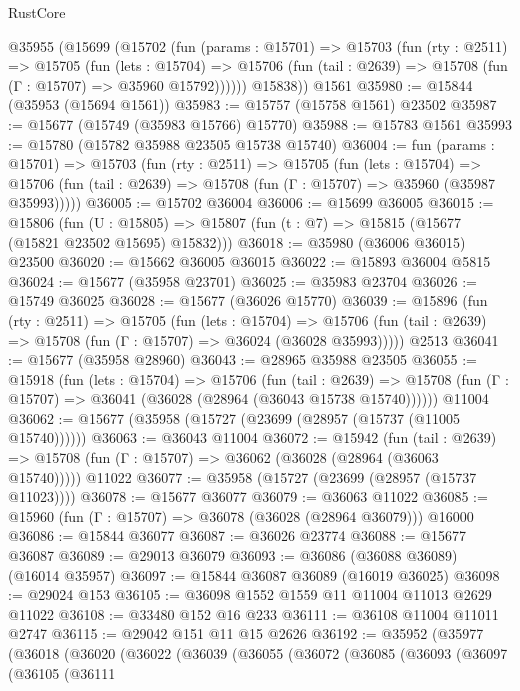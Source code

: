 \begin{lexlean}{RustCore}
\begin{coremodule}
    @35955
      (@15699
        (@15702
          (fun (params : @15701) =>
          @15703
            (fun (rty : @2511) =>
            @15705
              (fun (lets : @15704) =>
              @15706 (fun (tail : @2639) => @15708 (fun (Γ : @15707) => @35960 @15792))))))
        @15838))
    @1561
@35980 := @15844 (@35953 (@15694 @1561))
@35983 := @15757 (@15758 @1561) @23502
@35987 := @15677 (@15749 (@35983 @15766) @15770)
@35988 := @15783 @1561
@35993 := @15780 (@15782 @35988 @23505 @15738 @15740)
@36004 := fun (params : @15701) =>
  @15703
    (fun (rty : @2511) =>
    @15705
      (fun (lets : @15704) =>
      @15706 (fun (tail : @2639) => @15708 (fun (Γ : @15707) => @35960 (@35987 @35993)))))
@36005 := @15702 @36004
@36006 := @15699 @36005
@36015 := @15806
    (fun (U : @15805) => @15807 (fun (t : @7) => @15815 (@15677 (@15821 @23502 @15695) @15832)))
@36018 := @35980 (@36006 @36015) @23500
@36020 := @15662 @36005 @36015
@36022 := @15893 @36004 @5815
@36024 := @15677 (@35958 @23701)
@36025 := @35983 @23704
@36026 := @15749 @36025
@36028 := @15677 (@36026 @15770)
@36039 := @15896
    (fun (rty : @2511) =>
    @15705
      (fun (lets : @15704) =>
      @15706 (fun (tail : @2639) => @15708 (fun (Γ : @15707) => @36024 (@36028 @35993)))))
    @2513
@36041 := @15677 (@35958 @28960)
@36043 := @28965 @35988 @23505
@36055 := @15918
    (fun (lets : @15704) =>
    @15706
      (fun (tail : @2639) =>
      @15708 (fun (Γ : @15707) => @36041 (@36028 (@28964 (@36043 @15738 @15740))))))
    @11004
@36062 := @15677 (@35958 (@15727 (@23699 (@28957 (@15737 (@11005 @15740))))))
@36063 := @36043 @11004
@36072 := @15942
    (fun (tail : @2639) => @15708 (fun (Γ : @15707) => @36062 (@36028 (@28964 (@36063 @15740)))))
    @11022
@36077 := @35958 (@15727 (@23699 (@28957 (@15737 @11023))))
@36078 := @15677 @36077
@36079 := @36063 @11022
@36085 := @15960 (fun (Γ : @15707) => @36078 (@36028 (@28964 @36079))) @16000
@36086 := @15844 @36077
@36087 := @36026 @23774
@36088 := @15677 @36087
@36089 := @29013 @36079
@36093 := @36086 (@36088 @36089) (@16014 @35957)
@36097 := @15844 @36087 @36089 (@16019 @36025)
@36098 := @29024 @153
@36105 := @36098 @1552 @1559 @11 @11004 @11013 @2629 @11022
@36108 := @33480 @152 @16 @233
@36111 := @36108 @11004 @11011 @2747
@36115 := @29042 @151 @11 @15 @2626
@36192 := @35952
    (@35977
      (@36018
        (@36020
          (@36022
            (@36039
              (@36055
                (@36072
                  (@36085
                    (@36093
                      (@36097
                        (@36105
                          (@36111

\end{coremodule}
\end{lexlean}
